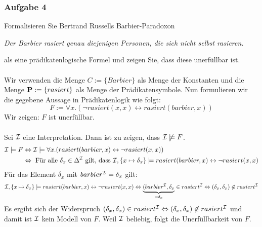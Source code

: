 \subsubsection*{Aufgabe 4}
\label{U9-4}
Formalisieren Sie Bertrand Russells Barbier-Paradoxon 
\begin{center}
\textit{Der Barbier rasiert genau diejenigen Personen, die sich nicht selbst rasieren.}
\end{center}
als eine prädikatenlogische Formel und zeigen Sie, dass diese unerfüllbar ist. \\\\
\LOES Wir verwenden die Menge $C := \{Barbier\}$ als Menge der Konstanten und die Menge $\textbf{P} := \{rasiert\}$ als Menge der Prädikatensymbole. Nun formulieren wir die gegebene Aussage in Prädikatenlogik wie folgt:
\begin{equation*}
F := \forall x.(\neg rasiert(x,x) \leftrightarrow rasiert(barbier,x))
\end{equation*}
Wir zeigen: $F$ ist unerfüllbar. \\\\
Sei $\mathcal{I}$ eine Interpretation. Dann ist zu zeigen, dass $\mathcal{I} \not\models F$. 
\begin{align*}
\mathcal{I} \models F &\Leftrightarrow \mathcal{I} \models \forall x.(rasiert(barbier,x) \leftrightarrow \neg rasiert(x,x)) \\
&\Leftrightarrow \text{ Für alle } \delta_x \in \Delta^{\mathcal{I}} \text{ gilt, dass } \mathcal{I}, \{ x \mapsto \delta_x \} \models rasiert(barbier, x)  \leftrightarrow \neg rasiert(x,x)
\end{align*}
Für das Element $\delta_x$ mit $barbier^{\mathcal{I}} = \delta_x$ gilt:
\begin{align*}
\mathcal{I}, \{x \mapsto \delta_x\} \models rasiert(barbier,x) \leftrightarrow \neg rasiert(x,x) 
\Leftrightarrow \underbrace{(barbier^{\mathcal{I}}, \delta_x}_{=\delta_x} \in rasiert^{\mathcal{I}} \Leftrightarrow (\delta_x, \delta_x) \not\in rasiert^{\mathcal{I}}
\end{align*}
Es ergibt sich der Widerspruch $(\delta_x, \delta_x) \in rasiert^{\mathcal{I}} \Leftrightarrow (\delta_x, \delta_x) \not\in rasiert^{\mathcal{I}}$ und damit ist $\mathcal{I}$ kein Modell von $F$. Weil $\mathcal{I}$ beliebig, folgt die Unerfüllbarkeit von $F$.
